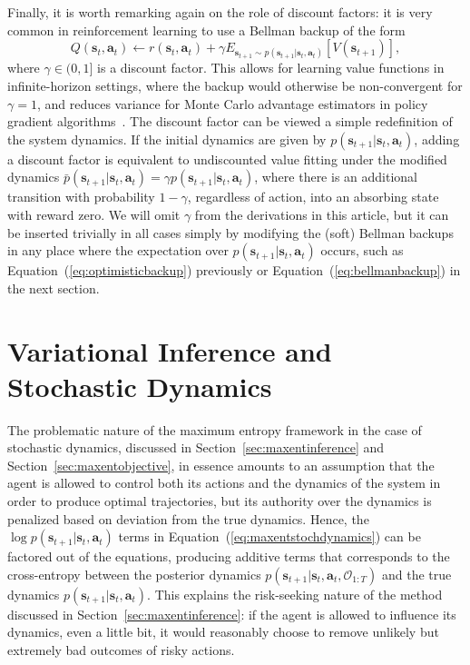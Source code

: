 Finally, it is worth remarking again on the role of discount factors: it is very common in reinforcement learning to use a Bellman backup of the form
\[
Q(\mathbf{s}_t,\mathbf{a}_t) \leftarrow r(\mathbf{s}_t,\mathbf{a}_t) + \gamma E_{\mathbf{s}_{t+1} \sim p(\mathbf{s}_{t+1}|\mathbf{s}_t,\mathbf{a}_t)}[V(\mathbf{s}_{t+1})],
\]
where $\gamma \in (0,1]$ is a discount factor. This allows for learning value functions in infinite-horizon settings, where the backup would otherwise be non-convergent for $\gamma = 1$, and reduces variance for Monte Carlo advantage estimators in policy gradient algorithms~\citep{gae}. The discount factor can be viewed a simple redefinition of the system dynamics. If the initial dynamics are given by $p(\mathbf{s}_{t+1}|\mathbf{s}_t,\mathbf{a}_t)$, adding a discount factor is equivalent to undiscounted value fitting under the modified dynamics $\bar{p}(\mathbf{s}_{t+1}|\mathbf{s}_t,\mathbf{a}_t) = \gamma p(\mathbf{s}_{t+1}|\mathbf{s}_t,\mathbf{a}_t)$, where there is an additional transition with probability $1-\gamma$, regardless of action, into an absorbing state with reward zero. We will omit $\gamma$ from the derivations in this article, but it can be inserted trivially in all cases simply by modifying the (soft) Bellman backups in any place where the expectation over $p(\mathbf{s}_{t+1}|\mathbf{s}_t,\mathbf{a}_t)$ occurs, such as Equation~(\ref{eq:optimisticbackup}) previously or Equation~(\ref{eq:bellmanbackup}) in the next section.

\section{Variational Inference and Stochastic Dynamics}
\label{sec:variational}

The problematic nature of the maximum entropy framework in the case of stochastic dynamics, discussed in Section~\ref{sec:maxentinference} and Section~\ref{sec:maxentobjective}, in essence amounts to an assumption that the agent is allowed to control both its actions and the dynamics of the system in order to produce optimal trajectories, but its authority over the dynamics is penalized based on deviation from the true dynamics. Hence, the $\log p(\mathbf{s}_{t+1} |\mathbf{s}_t,\mathbf{a}_t)$ terms in Equation~(\ref{eq:maxentstochdynamics}) can be factored out of the equations, producing additive terms that corresponds to the cross-entropy between the posterior dynamics $p(\mathbf{s}_{t+1}|\mathbf{s}_t,\mathbf{a}_t, \mathcal{O}_{1:T})$ and the true dynamics $p(\mathbf{s}_{t+1} |\mathbf{s}_t,\mathbf{a}_t)$. This explains the risk-seeking nature of the method discussed in Section~\ref{sec:maxentinference}: if the agent is allowed to influence its dynamics, even a little bit, it would reasonably choose to remove unlikely but extremely bad outcomes of risky actions.

